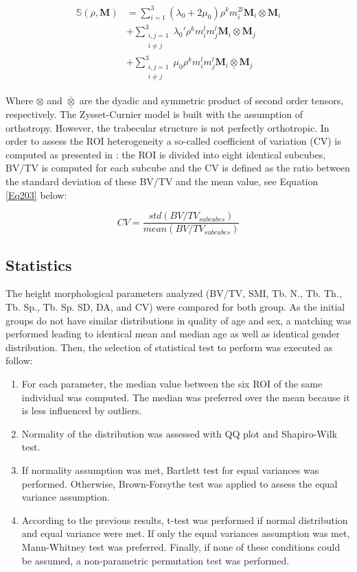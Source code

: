 \documentclass[a4paper,fleqn]{DC_ArtStyle}
\begin{document}
\begin{equation}
	\begin{split}
		\mathbb{S}(\rho,\mathbf{M}) & = \sum_{i=1}^{3} (\lambda_0 + 2\mu_0)\rho^k m_i^{2l} \mathbf{M}_i \otimes \mathbf{M}_i \\ & + \sum_{\substack{i,j=1\\i \neq j}}^{3} \lambda_0' \rho^k m_i^{l} m_j^{l} \mathbf{M}_i \otimes \mathbf{M}_j \\ & + \sum_{\substack{i,j=1\\i \neq j}}^{3} \mu_0 \rho^k m_i^{l} m_j^{l} \mathbf{M}_i \overline{\underline{\otimes}} \mathbf{M}_j
	\end{split}
	\label{Eq202}
\end{equation}

Where $\otimes$ and $\overline{\underline{\otimes}}$ are the dyadic and symmetric product of second order tensors, respectively. The Zysset-Curnier model is built with the assumption of orthotropy. However, the trabecular structure is not perfectly orthotropic. In order to assess the ROI heterogeneity a so-called coefficient of variation (CV) is computed as presented in \cite{Panyasantisuk2015}: the ROI is divided into eight identical subcubes, BV/TV is computed for each subcube and the CV is defined as the ratio between the standard deviation of these BV/TV and the mean value, see Equation \ref{Eq203} below:

\begin{equation}
	CV = \frac{std(BV/TV_{subcubes})}{mean(BV/TV_{subcubes})}
	\label{Eq203}
\end{equation}

\subsection{Statistics}
The height morphological parameters analyzed (BV/TV, SMI, Tb. N., Tb. Th., Tb. Sp., Tb. Sp. SD, DA, and CV) were compared for both group. As the initial groups do not have similar distributions in quality of age and sex, a matching was performed leading to identical mean and median age as well as identical gender distribution. Then, the selection of statistical test to perform was executed as follow:
\begin{enumerate}
	\item For each parameter, the median value between the six ROI of the same individual was computed. The median was preferred over the mean because it is less influenced by outliers.
	\item Normality of the distribution was assessed with QQ plot and Shapiro-Wilk test.
	\item If normality assumption was met, Bartlett test for equal variances was performed. Otherwise, Brown-Forsythe test was applied to assess the equal variance assumption.
	\item According to the previous results, t-test was performed if normal distribution and equal variance were met. If only the equal variances assumption was met, Mann-Whitney test was preferred. Finally, if none of these conditions could be assumed, a non-parametric permutation test was performed.
\end{enumerate}
\end{document}
